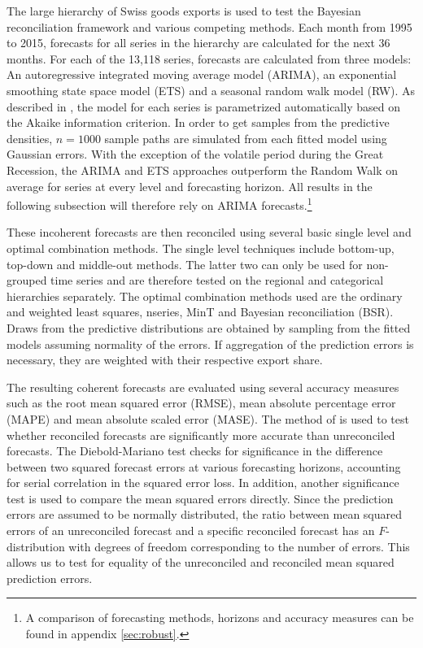 \documentclass[a4paper,fleqn,11pt]{article}
\begin{document}
The large hierarchy of Swiss goods exports is used to test the Bayesian reconciliation framework and various competing methods. Each month from 1995 to 2015, forecasts for all series in the hierarchy are calculated for the next 36 months. For each of the 13,118 series, forecasts are calculated from three models: An autoregressive integrated moving average model (ARIMA), an exponential smoothing state space model (ETS) and a seasonal random walk model (RW). As described in \cite{Hyndman2008}, the model for each series is parametrized automatically based on the Akaike information criterion. In order to get samples from the predictive densities, $n = 1000$ sample paths are simulated from each fitted model using Gaussian errors. With the exception of the volatile period during the Great Recession, the ARIMA and ETS approaches outperform the Random Walk on average for series at every level and forecasting horizon. All results in the following subsection will therefore rely on ARIMA forecasts.\footnote{A comparison of forecasting methods, horizons and accuracy measures can be found in appendix \ref{sec:robust}.}

These incoherent forecasts are then reconciled using several basic single level and optimal combination methods. The single level techniques include bottom-up, top-down and middle-out methods. The latter two can only be used for non-grouped time series and are therefore tested on the regional and categorical hierarchies separately. The optimal combination methods used are the ordinary and weighted least squares, nseries, MinT and Bayesian reconciliation (BSR). Draws from the predictive distributions are obtained by sampling from the fitted models assuming normality of the errors. If aggregation of the prediction errors is necessary, they are weighted with their respective export share.

The resulting coherent forecasts are evaluated using several accuracy measures such as the root mean squared error (RMSE), mean absolute percentage error (MAPE) and mean absolute scaled error (MASE). The method of \cite{Diebold1995} is used to test whether reconciled forecasts are significantly more accurate than unreconciled forecasts. The Diebold-Mariano test checks for significance in the difference between two squared forecast errors at various forecasting horizons, accounting for serial correlation in the squared error loss. In addition, another significance test is used to compare the mean squared errors directly. Since the prediction errors are assumed to be normally distributed, the ratio between mean squared errors of an unreconciled forecast and a specific reconciled forecast has an $F$-distribution with degrees of freedom corresponding to the number of errors. This allows us to test for equality of the unreconciled and reconciled mean squared prediction errors.
\end{document}
